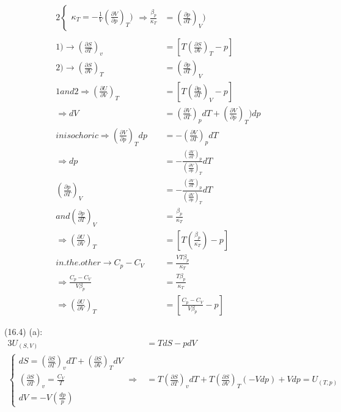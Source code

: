 \begin{latin}
\begin{alignat*}{2}
\begin{cases}
    \kappa_T = - \frac{1}{V}(\frac{\partial V}{\partial p})_T )
    \end{cases}
    \Longrightarrow\frac{\beta_p}{\kappa_T} &= (\frac{\partial p}{\partial T})_V )\\\\
    1)\to(\frac{\partial S}{\partial T})_v &= [T(\frac{\partial S}{\partial V})_T -p]\\
    2)\to (\frac{\partial S}{\partial V})_T &= (\frac{\partial p}{\partial T})_V\\
    1and2\Longrightarrow (\frac{\partial U}{\partial V})_T  &= [T(\frac{\partial p}{\partial T})_V -p ]\\
    \Longrightarrow dV &= (\frac{\partial V}{\partial T})_pdT + (\frac{\partial V}{\partial p})_T)dp \\ 
    in isochoric \Longrightarrow (\frac{\partial V}{\partial p})_T dp &= -(\frac{\partial V}{\partial T})_pdT\\
    \Longrightarrow dp &= - \frac{(\frac{\partial V}{\partial T})_p}{(\frac{\partial V}{\partial p})_T}dT\\
    (\frac{\partial p}{\partial T})_V &= - \frac{(\frac{\partial V}{\partial T})_p}{(\frac{\partial V}{\partial p})_T}dT\\
    and (\frac{\partial p}{\partial T})_V &= \frac{\beta_p}{\kappa_T}\\
    \Longrightarrow (\frac{\partial U}{\partial V})_T &= [T(\frac{\beta_p}{\kappa_T}) - p]\\
    in.the.other \to C_p -C_V &= \frac{VT\beta_p }{\kappa_T}\\
    \Longrightarrow \frac{C_p - C_V}{V\beta_p} &= \frac{T\beta_p}{\kappa_T}\\
    \Longrightarrow (\frac{\partial U}{\partial V})_T &= [\frac{C_p - C_V}{V\beta_p} -p]
    \end{alignat*}

    (16.4) (a): \
    \begin{alignat*}{3}
        U_(S,V) &= TdS - pdV\\
    \begin{cases} 
        dS = (\frac{\partial S}{\partial T})_v dT +(\frac{\partial S}{\partial V})_T dV\\
        (\frac{\partial S}{\partial T})_v = \frac{C_V}{T}\\
        dV = -V(\frac{dp}{p})
    \end{cases}
        \Longrightarrow&= T(\frac{\partial S}{\partial T})_v dT + T(\frac{\partial S}{\partial V})_T (-Vdp) + Vdp= U_(T,p)\\\\
    \end{alignat*}


\end{latin}
